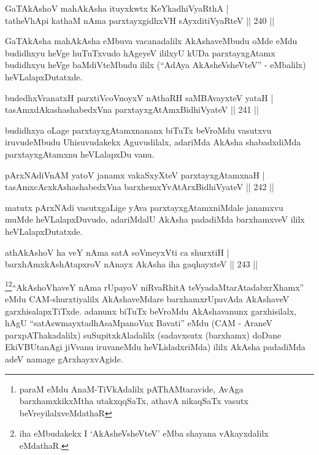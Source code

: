 \begin{shl}
GaTAkAshoV mahAkAsha ituyxkwtx KeYkadhiVyaRthA |\\
tatheVhApi kathaM nAma parxtayxgidhxVH sAyxditiVyaRteV \hfill || 240 ||
\end{shl}

\begin{artha}
GaTAkAsha mahAkAsha eMbuva vacanadalilx AkAshaveMbudu oMde eMdu budidhxyu heVge huTuTxvudo hAgeyeV ililxyU kUDa parxtayxgAtamx budidhxyu heVge baMdiVteMbudu ililx (``AdAya AkAsheVsheVteV'' - eMbalilx) heVLalapxDutatxde.
\end{artha}

\begin{shl}
budedhxVranatxH parxtiVcoV\s noyxV nAthaRH saMBAvayxteV yataH |\\
tasAmxdAkashashabedxVna parxtayxgAtAmx\s BidhiVyateV \hfill || 241 ||
\end{shl}

\begin{artha}
budidhxya oLage parxtayxgAtamxnananx biTuTx beVroMdu vasutxvu iruvudeMbudu Uhisuvudakekx Aguvudilalx, adariMda AkAsha shabadxdiMda parxtayxgAtamxnu heVLalapxDu	vanu.
\end{artha}

\begin{shl}
pArxNAdiVnAM yatoV janamx vakaSxyXteV parxtayxgAtamxnaH |\\
tasAmxcAcx\s \s kAshashabedxVna barxhemxYvAtArxBidhiVyateV \hfill || 242 ||
\end{shl}

\begin{artha}
matutx pArxNAdi vasutxgaLige yAva parxtayxgAtamxniMdale janamxvu muMde heVLalapxDuvudo, adariMdalU AkAsha padadiMda barxhamxveV ililx heVLalapxDutatxde.
\end{artha}


\begin{shl}
athA\s \s kAshoV ha veY nAma satA soVmeyxVti ca shurxtiH |\\
barxhAmxkAshAtapxroV nAnayx AkAsha iha gaqhayxteV \hfill || 243 ||
\end{shl}

\begin{artha}
\footnote{paraM eMdu AnaM-TiVkAdalilx pAThAMtaravide, AvAga  barxhamxkikxMtha utakxqqSaTx, athavA nikaqSaTx vasutx  beVreyilalxveMdathaR}\footnote{iha eMbudakekx I `AkAsheVsheVteV' eMba  shayana vAkayxdalilx eMdathaR.}``AkAshoVhaveY nAma rUpayoV niRvaRhitA teVyadaMtarAtadabxrXhamx'' eMdu CAM-shurxtiyalilx  AkAshaveMdare barxhamxrUpavAda AkAshaveV garxhisalapxTiTxde. adanunx biTuTx beVroMdu AkAshavanunx garxhisilalx, hAgU ``satAswmayxtadhAsaMpanoVnx Bavati'' eMdu (CAM - AraneV parxpAThakadalilx) suSupitxkAladalilx (sadavxsutx (barxhamx) doDane EkiVBUtanAgi jiVvanu iruvaneMdu heVLidadxriMda) ililx AkAsha padadiMda adeV namage gArxhayxvAgide.
\end{artha}

